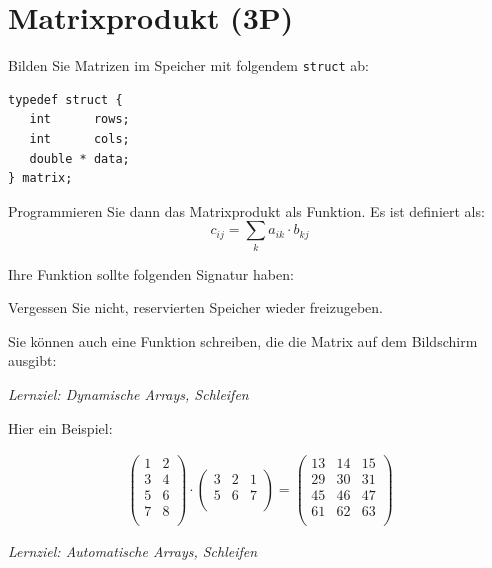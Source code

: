 \documentclass[
	ngerman,
	fontsize=10pt,
	parskip=half,
	titlepage=true,
	DIV=12
]{scrartcl}
\begin{document}
\section{Matrixprodukt (3P)}
Bilden Sie Matrizen im Speicher mit folgendem \texttt{struct} ab:
\begin{verbatim}
typedef struct {
   int      rows;
   int      cols;
   double * data;
} matrix;
\end{verbatim}

Programmieren Sie dann das Matrixprodukt als Funktion. Es ist definiert als:
\[ c_{ij} = \sum_k a_{ik} \cdot b_{kj} \]

Ihre Funktion sollte folgenden Signatur haben:

Vergessen Sie nicht, reservierten Speicher wieder freizugeben.

Sie können auch eine Funktion schreiben, die die Matrix auf dem Bildschirm ausgibt:

\emph{Lernziel: Dynamische Arrays, Schleifen}

Hier ein Beispiel:

\begin{gather*}
\begin{pmatrix}
1& 2\\
3& 4\\
5& 6\\
7& 8\\
\end{pmatrix}
\cdot
\begin{pmatrix}
3& 2& 1\\
5& 6& 7\\
\end{pmatrix}
=
\begin{pmatrix}
13& 14& 15\\
29& 30& 31\\
45& 46& 47\\
61& 62& 63\\
\end{pmatrix}
\end{gather*}

{\em Lernziel: Automatische Arrays, Schleifen}
\end{document}
